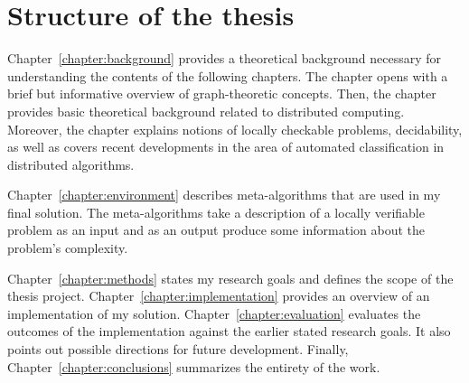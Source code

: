 \section{Structure of the thesis}
\label{section:structure} 

Chapter~\ref{chapter:background} provides a theoretical
background necessary for understanding the contents of the
following chapters. The chapter opens with
a brief but informative overview of graph-theoretic
concepts. Then, the chapter provides basic
theoretical background related to distributed computing.
Moreover, the chapter explains notions of
locally checkable problems, decidability, as well as
covers recent developments in the area of
automated classification in distributed algorithms.

Chapter~\ref{chapter:environment} describes
meta-algorithms that are used in my final
solution. The meta-algorithms take a description
of a locally verifiable problem as an input and
as an output produce some information about the
problem's complexity.

Chapter~\ref{chapter:methods} states my research goals
and defines the scope of the thesis project.
Chapter~\ref{chapter:implementation}
provides an overview of an implementation of
my solution. Chapter~\ref{chapter:evaluation}
evaluates the outcomes of the implementation
against the earlier stated research goals. It
also points out possible directions for
future development. Finally, Chapter~\ref{chapter:conclusions}
summarizes the entirety of the work.

